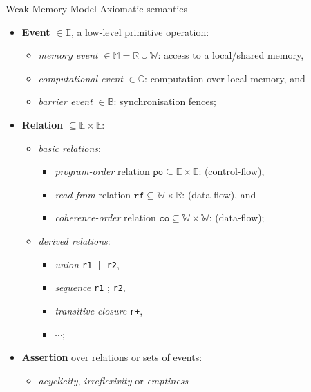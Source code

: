 \documentclass{beamer}
\begin{document}
\begin{frame}{Weak Memory Model} {Axiomatic semantics}

\begin{itemize}
  \addtolength{\tabcolsep}{0pt}
  \item \textbf{Event} $\in \mathbb{E}$, a low-level primitive operation:
    \begin{itemize}
      \item \textit{memory event} $\in \mathbb{M} = \mathbb{R} \cup \mathbb{W}$: access to a local/shared memory, \\
      \item \textit{computational event} $\in \mathbb{C}$: computation over local memory, and \\
      \item \textit{barrier event} $\in \mathbb{B}$: synchronisation fences;
     \end{itemize}
  \item \textbf{Relation} $\subseteq \mathbb{E} \times \mathbb{E}$: 
    \begin{itemize}
    \item \textit{basic relations}:%
      \begin{itemize}
        \item \textit{program-order} relation $\texttt{po} \subseteq \mathbb{E} \times \mathbb{E}$: (control-flow),
        \item \textit{read-from} relation $\texttt{rf} \subseteq \mathbb{W} \times \mathbb{R}$: (data-flow), and
        \item \textit{coherence-order} relation $\texttt{co} \subseteq \mathbb{W} \times \mathbb{W}$: (data-flow);
      \end{itemize}
    \item \textit{derived relations}:%
      \begin{itemize}
        \item \textit{union} \texttt{r1\,|\,r2},
        \item \textit{sequence} \texttt{r1} ; \texttt{r2},
        \item \textit{transitive closure} \texttt{r+},
        \item $\cdots$;
      \end{itemize}
    \end{itemize}
  \item \textbf{Assertion} over relations or sets of events: 
    \begin{itemize}
    \item \textit{acyclicity}, \textit{irreflexivity} or \textit{emptiness} 
    \end{itemize}
\end{itemize}

\end{frame}
\end{document}
